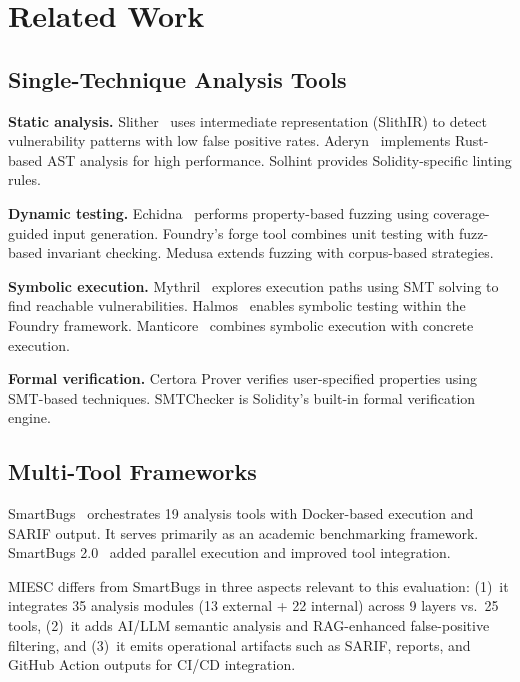 \documentclass[conference]{IEEEtran}
\begin{document}
\section{Related Work}

\subsection{Single-Technique Analysis Tools}

\textbf{Static analysis.} Slither~\cite{feist2019slither} uses intermediate representation (SlithIR) to detect vulnerability patterns with low false positive rates. Aderyn~\cite{aderyn2024} implements Rust-based AST analysis for high performance. Solhint provides Solidity-specific linting rules.

\textbf{Dynamic testing.} Echidna~\cite{grieco2020echidna} performs property-based fuzzing using coverage-guided input generation. Foundry's forge tool combines unit testing with fuzz-based invariant checking. Medusa extends fuzzing with corpus-based strategies.

\textbf{Symbolic execution.} Mythril~\cite{mueller2018smashing} explores execution paths using SMT solving to find reachable vulnerabilities. Halmos~\cite{halmos2023} enables symbolic testing within the Foundry framework. Manticore~\cite{mossberg2019manticore} combines symbolic execution with concrete execution.

\textbf{Formal verification.} Certora Prover verifies user-specified properties using SMT-based techniques. SMTChecker is Solidity's built-in formal verification engine.

\subsection{Multi-Tool Frameworks}

SmartBugs~\cite{ferreira2020smartbugs} orchestrates 19 analysis tools with Docker-based execution and SARIF output. It serves primarily as an academic benchmarking framework. SmartBugs 2.0~\cite{smartbugs2023} added parallel execution and improved tool integration.

MIESC differs from SmartBugs in three aspects relevant to this evaluation: (1)~it integrates 35 analysis modules (13 external + 22 internal) across 9 layers vs.\ 25 tools, (2)~it adds AI/LLM semantic analysis and RAG-enhanced false-positive filtering, and (3)~it emits operational artifacts such as SARIF, reports, and GitHub Action outputs for CI/CD integration.
\end{document}
